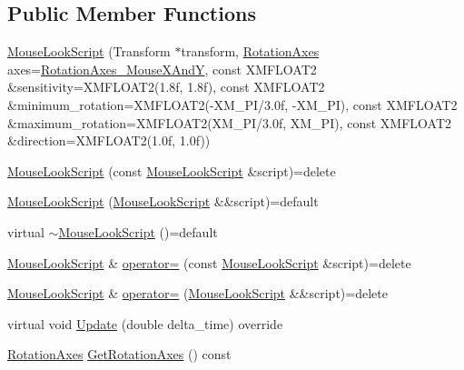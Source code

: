 \subsection*{Public Member Functions}
\begin{DoxyCompactItemize}
\item 
\hyperlink{classmage_1_1_mouse_look_script_a577529718cd5d5208976f5485de29ba1}{Mouse\+Look\+Script} (Transform $\ast$transform, \hyperlink{namespacemage_a548e5c31b08a1078841ed21948f5bf4c}{Rotation\+Axes} axes=\hyperlink{namespacemage_a548e5c31b08a1078841ed21948f5bf4ca6b0dd5cb81f83efb4c2b36456d84750d}{Rotation\+Axes\+\_\+\+Mouse\+X\+AndY}, const X\+M\+F\+L\+O\+A\+T2 \&sensitivity=X\+M\+F\+L\+O\+A\+T2(1.\+8f, 1.\+8f), const X\+M\+F\+L\+O\+A\+T2 \&minimum\+\_\+rotation=\+X\+M\+F\+L\+O\+A\+T2(-\/\+X\+M\+\_\+\+P\+I/3.\+0f, -\/\+X\+M\+\_\+P\+I), const X\+M\+F\+L\+O\+A\+T2 \&maximum\+\_\+rotation=\+X\+M\+F\+L\+O\+A\+T2(\+X\+M\+\_\+\+P\+I/3.\+0f, X\+M\+\_\+P\+I), const X\+M\+F\+L\+O\+A\+T2 \&direction=\+X\+M\+F\+L\+O\+A\+T2(1.\+0f, 1.\+0f))
\item 
\hyperlink{classmage_1_1_mouse_look_script_a54bd09419068ab61c4dd6fda412771d3}{Mouse\+Look\+Script} (const \hyperlink{classmage_1_1_mouse_look_script}{Mouse\+Look\+Script} \&script)=delete
\item 
\hyperlink{classmage_1_1_mouse_look_script_ab922490b99932e26d27e256a71db9905}{Mouse\+Look\+Script} (\hyperlink{classmage_1_1_mouse_look_script}{Mouse\+Look\+Script} \&\&script)=default
\item 
virtual \hyperlink{classmage_1_1_mouse_look_script_afe4592321c71e9e64a9f355b1f9cd938}{$\sim$\+Mouse\+Look\+Script} ()=default
\item 
\hyperlink{classmage_1_1_mouse_look_script}{Mouse\+Look\+Script} \& \hyperlink{classmage_1_1_mouse_look_script_a13fba7e90bf10d24814e0a8cec25645e}{operator=} (const \hyperlink{classmage_1_1_mouse_look_script}{Mouse\+Look\+Script} \&script)=delete
\item 
\hyperlink{classmage_1_1_mouse_look_script}{Mouse\+Look\+Script} \& \hyperlink{classmage_1_1_mouse_look_script_a2754174f5595fa424471c631818dc2b6}{operator=} (\hyperlink{classmage_1_1_mouse_look_script}{Mouse\+Look\+Script} \&\&script)=delete
\item 
virtual void \hyperlink{classmage_1_1_mouse_look_script_a7962403a78c02b2fe64e8f06f6319312}{Update} (double delta\+\_\+time) override
\item 
\hyperlink{namespacemage_a548e5c31b08a1078841ed21948f5bf4c}{Rotation\+Axes} \hyperlink{classmage_1_1_mouse_look_script_ae7ca5fd8fcfa1fbe6654bae9abc0c5b7}{Get\+Rotation\+Axes} () const

\end{DoxyCompactItemize}
